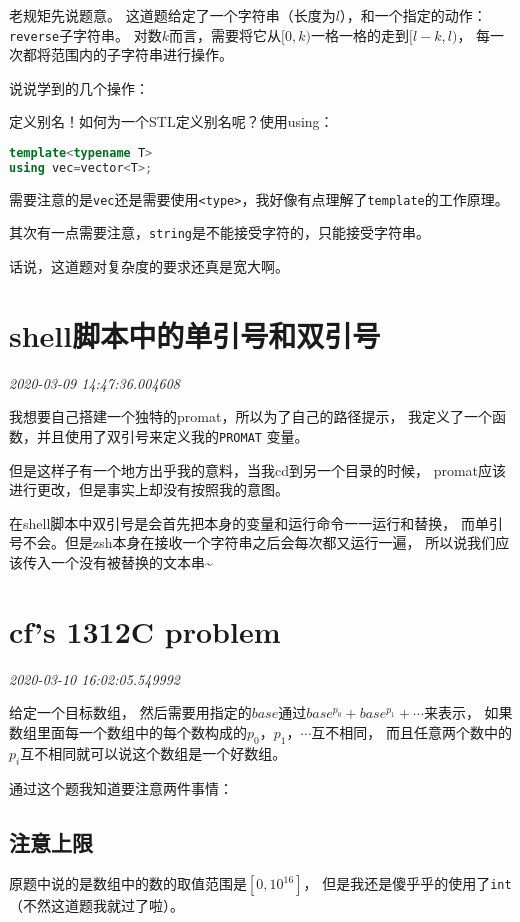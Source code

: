 \documentclass{peterlitsdoc}
\newcommand{\timetx}[1]
    {\par\noindent\emph{\pltgray\small #1}\vspace{2em}}
\newcommand{\vb}{\verb}
\begin{document}
老规矩先说题意。
这道题给定了一个字符串（长度为$l$），和一个指定的动作：\vb|reverse|子字符串。
对数$k$而言，需要将它从$[0, k)$一格一格的走到$[l-k,l)$，
每一次都将范围内的子字符串进行操作。

说说学到的几个操作：

定义别名！如何为一个STL定义别名呢？使用using：
\begin{lstlisting}[language=C++]
template<typename T>
using vec=vector<T>;
\end{lstlisting}

需要注意的是\vb|vec|还是需要使用\vb|<type>|，我好像有点理解了\vb|template|的工作原理。

其次有一点需要注意，\vb|string|是不能接受字符的，只能接受字符串。

话说，这道题对复杂度的要求还真是宽大啊。


\section{shell脚本中的单引号和双引号}\timetx{2020-03-09 14:47:36.004608}

我想要自己搭建一个独特的promat，所以为了自己的路径提示，
我定义了一个函数，并且使用了双引号来定义我的\vb|PROMAT|
变量。

但是这样子有一个地方出乎我的意料，当我cd到另一个目录的时候，
promat应该进行更改，但是事实上却没有按照我的意图。

在shell脚本中双引号是会首先把本身的变量和运行命令一一运行和替换，
而单引号不会。但是zsh本身在接收一个字符串之后会每次都又运行一遍，
所以说我们应该传入一个没有被替换的文本串\~{}


\section{cf's 1312C problem}\timetx{2020-03-10 16:02:05.549992}

给定一个目标数组，
然后需要用指定的$base$通过$base^{p_0}+base^{p_1}+\cdots$来表示，
如果数组里面每一个数组中的每个数构成的$p_0$，$p_1$，$\cdots$互不相同，
而且任意两个数中的$p_i$互不相同就可以说这个数组是一个好数组。

通过这个题我知道要注意两件事情：

\subsection{注意上限}
原题中说的是数组中的数的取值范围是$[0,10^{16}]$，
但是我还是傻乎乎的使用了\vb|int|（不然这道题我就过了啦）。
\end{document}
